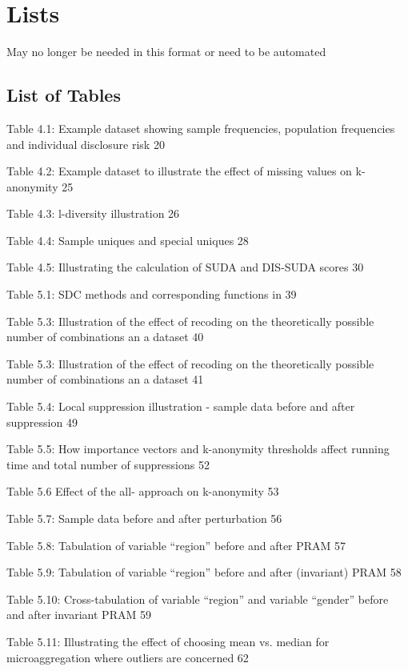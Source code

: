\documentclass[letterpaper,10pt,english]{sphinxmanual}
\begin{document}
\chapter{Lists}
\label{\detokenize{lists::doc}}\label{\detokenize{lists:lists}}
May no longer be needed in this format or need to be automated


\section{List of Tables}
\label{\detokenize{lists:list-of-tables}}
Table 4.1: Example dataset showing sample frequencies, population
frequencies and individual disclosure risk 20

Table 4.2: Example dataset to illustrate the effect of missing values on
k-anonymity 25

Table 4.3: l-diversity illustration 26

Table 4.4: Sample uniques and special uniques 28

Table 4.5: Illustrating the calculation of SUDA and DIS-SUDA scores 30

Table 5.1: SDC methods and corresponding functions in  39

Table 5.3: Illustration of the effect of recoding on the theoretically
possible number of combinations an a dataset 40

Table 5.3: Illustration of the effect of recoding on the theoretically
possible number of combinations an a dataset 41

Table 5.4: Local suppression illustration - sample data before and after
suppression 49

Table 5.5: How importance vectors and k-anonymity thresholds affect
running time and total number of suppressions 52

Table 5.6 Effect of the all- approach on k-anonymity 53

Table 5.7: Sample data before and after perturbation 56

Table 5.8: Tabulation of variable “region” before and after PRAM 57

Table 5.9: Tabulation of variable “region” before and after (invariant)
PRAM 58

Table 5.10: Cross-tabulation of variable “region” and variable “gender”
before and after invariant PRAM 59

Table 5.11: Illustrating the effect of choosing mean vs. median for
microaggregation where outliers are concerned 62
\end{document}

